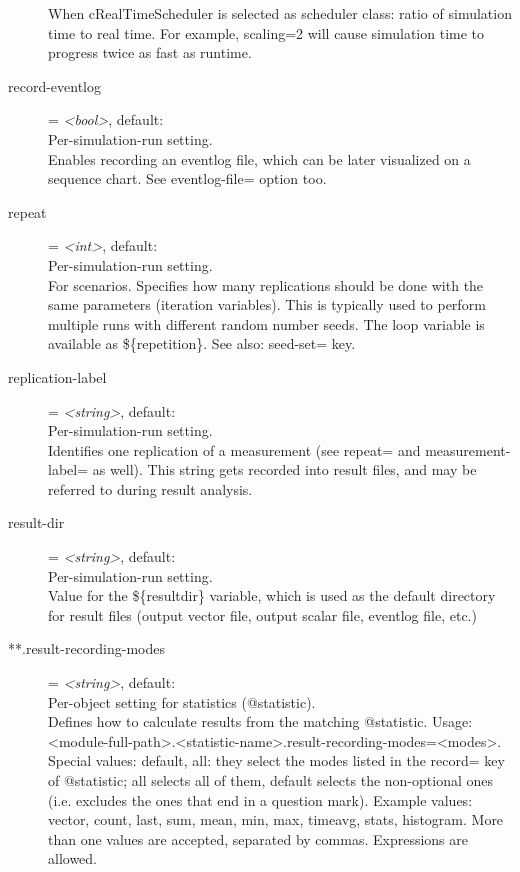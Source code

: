 \begin{description}
    When cRealTimeScheduler is selected as scheduler class: ratio of simulation
    time to real time. For example, scaling=2 will cause simulation time to
    progress twice as fast as runtime.
\item[record-eventlog] = \textit{<bool>}, default: \\
    Per-simulation-run setting.\\
    Enables recording an eventlog file, which can be later visualized on a
    sequence chart. See eventlog-file= option too.
\item[repeat] = \textit{<int>}, default: \\
    Per-simulation-run setting.\\
    For scenarios. Specifies how many replications should be done with the same
    parameters (iteration variables). This is typically used to perform
    multiple runs with different random number seeds. The loop variable is
    available as \$\{repetition\}. See also: seed-set= key.
\item[replication-label] = \textit{<string>}, default: \\
    Per-simulation-run setting.\\
    Identifies one replication of a measurement (see repeat= and
    measurement-label= as well). This string gets recorded into result files,
    and may be referred to during result analysis.
\item[result-dir] = \textit{<string>}, default: \\
    Per-simulation-run setting.\\
    Value for the \$\{resultdir\} variable, which is used as the default
    directory for result files (output vector file, output scalar file,
    eventlog file, etc.)
\item[**.result-recording-modes] = \textit{<string>}, default: \\
    Per-object setting for statistics (@statistic).\\
    Defines how to calculate results from the matching @statistic. Usage:
    <module-full-path>.<statistic-name>.result-recording-modes=<modes>. Special
    values: default, all: they select the modes listed in the record= key of
    @statistic; all selects all of them, default selects the non-optional ones
    (i.e. excludes the ones that end in a question mark). Example values:
    vector, count, last, sum, mean, min, max, timeavg, stats, histogram. More
    than one values are accepted, separated by commas. Expressions are allowed.

\end{description}
